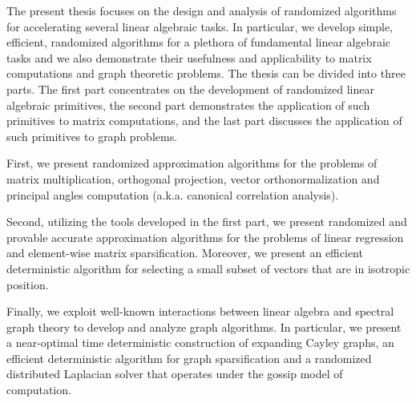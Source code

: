 The present thesis focuses on the design and analysis of randomized algorithms for accelerating several linear algebraic tasks. In particular, we develop simple, efficient, randomized algorithms for a plethora of fundamental linear algebraic tasks and we also demonstrate their usefulness and applicability to matrix computations and graph theoretic problems. The thesis can be divided into three parts. The first part concentrates on the development of randomized linear algebraic primitives, the second part demonstrates the application of such primitives to matrix computations, and the last part discusses the application of such primitives to graph problems.
%

%
First, we present randomized approximation algorithms for the problems of matrix multiplication, orthogonal projection, vector orthonormalization and principal angles computation (a.k.a. canonical correlation analysis).
%

%
Second, utilizing the tools developed in the first part, we present randomized and provable accurate approximation algorithms for the problems of linear regression and element-wise matrix sparsification. Moreover, we present an efficient deterministic algorithm for selecting a small subset of vectors that are in isotropic position.
%

%
Finally, we exploit well-known interactions between linear algebra and spectral graph theory to develop and analyze graph algorithms. In particular, we present a near-optimal time deterministic construction of expanding Cayley graphs, an efficient deterministic algorithm for graph sparsification and a randomized distributed Laplacian solver that operates under the gossip model of computation.
%